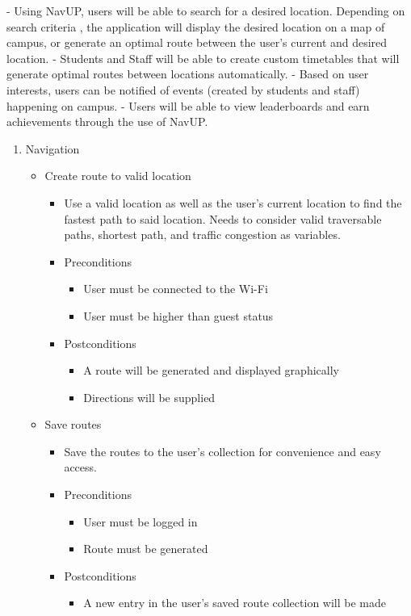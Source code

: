 \documentclass[12pt]{article}
\begin{document}
	- Using NavUP, users will be able to search for a desired location. Depending on search criteria , the application will display the desired location on a map of campus, or generate an optimal route between the user's current and desired location. 
	- Students and Staff will be able to create custom timetables that will generate optimal routes between locations automatically.
	- Based on user interests, users can be notified of events (created by students and staff) happening on campus.
	- Users will be able to view leaderboards and earn achievements through the use of NavUP. 

		\begin{enumerate}
		  	\item Navigation	
		  	
			\begin{itemize}
			
				\item Create route to valid location
				\begin{itemize}
					\item Use a valid location as well as the user’s current location to find the fastest path to said location. Needs to consider valid traversable paths, shortest path, and traffic congestion as variables.
					\item Preconditions
					\begin{itemize}
						\item User must be connected to the Wi-Fi
						\item User must be higher than guest status
					\end{itemize}
					\item Postconditions
					\begin{itemize}
						\item A route will be generated and displayed graphically 
						\item Directions will be supplied
					\end{itemize}
				\end{itemize}
				
				\item Save routes
				\begin{itemize}
					\item Save the routes to the user’s collection for convenience and easy access.
					\item Preconditions
					\begin{itemize}
						\item User must be logged in
						\item Route must be generated
					\end{itemize}
					\item Postconditions
					\begin{itemize}
						\item A new entry in the user’s saved route collection will be made
					\end{itemize}
				\end{itemize}
				

\end{itemize}
\end{enumerate}
\end{document}
